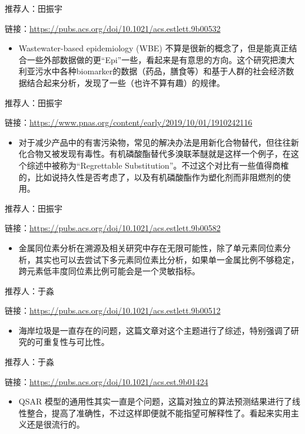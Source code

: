 \documentclass[
]{book}
\providecommand{\tightlist}{%
  \setlength{\itemsep}{0pt}\setlength{\parskip}{0pt}}
\begin{document}
推荐人：田振宇

链接：\url{https://pubs.acs.org/doi/10.1021/acs.estlett.9b00532}

\begin{itemize}
\tightlist
\item
  Wastewater-based epidemiology (WBE) 不算是很新的概念了，但是能真正结合一些外部数据做的更``Epi''一些，看起来是有意思的方向。这个研究把澳大利亚污水中各种biomarker的数据（药品，膳食等）和基于人群的社会经济数据结合起来分析，发现了一些（也许不算有趣）的规律。
\end{itemize}

推荐人：田振宇

链接：\url{https://www.pnas.org/content/early/2019/10/01/1910242116}

\begin{itemize}
\tightlist
\item
  对于减少产品中的有害污染物，常见的解决办法是用新化合物替代，但往往新化合物又被发现有毒性。有机磷酸酯替代多溴联苯醚就是这样一个例子，在这个综述中被称为``Regrettable Substitution''。不过这个对比有一些值得商榷的，比如说持久性是否考虑了，以及有机磷酸酯作为塑化剂而非阻燃剂的使用。
\end{itemize}

推荐人：田振宇

链接：\url{https://pubs.acs.org/doi/10.1021/acs.estlett.9b00582}

\begin{itemize}
\tightlist
\item
  金属同位素分析在溯源及相关研究中存在无限可能性，除了单元素同位素分析，其实也可以去尝试下多元素同位素比分析，如果单一金属比例不够稳定，跨元素低丰度同位素比例可能会是一个灵敏指标。
\end{itemize}

推荐人：于淼

链接：\url{https://pubs.acs.org/doi/10.1021/acs.estlett.9b00512}

\begin{itemize}
\tightlist
\item
  海岸垃圾是一直存在的问题，这篇文章对这个主题进行了综述，特别强调了研究的可重复性与可比性。
\end{itemize}

推荐人：于淼

链接：\url{https://pubs.acs.org/doi/10.1021/acs.est.9b01424}

\begin{itemize}
\tightlist
\item
  QSAR 模型的通用性其实一直是个问题，这篇对独立的算法预测结果进行了线性整合，提高了准确性，不过这样即便就不能指望可解释性了。看起来实用主义还是很流行的。
\end{itemize}
\end{document}
